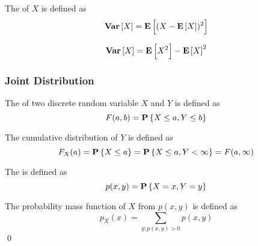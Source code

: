\begin{definition}[variance]
    The  of $X$ is defined as
    \begin{equation}
        \mathop{\bf Var\/}\left[ X \right] = \mathop{\bf E\/} \left[ (X - \mathop{\bf E\/} \left[ X \right])^2 \right]
    \end{equation}
\end{definition}


\begin{theorem}
    \begin{equation}
        \mathop{\bf Var\/}\left[ X \right] = \mathop{\bf E\/} \left[ X^2 \right] - \mathop{\bf E\/} \left[ X \right]^2
    \end{equation}
\end{theorem}



\subsubsection{Joint Distribution}

\begin{definition}
    The  of two discrete random variable $X$ and $Y$ is defined as
    \begin{equation}
        F(a,b) = \mathop{\bf P\/}\left\{ X \leq a, Y \leq b \right\}
    \end{equation}
    
    The cumulative distribution of $Y$ is defined as
    \begin{equation}
        F_X(a) = \mathop{\bf P\/}\left\{X \leq a \right\} =\mathop{\bf P\/}\left\{X \leq a, Y < \infty \right\} = F(a, \infty)
    \end{equation}
    
    The  is defined as 
    \begin{equation}
        p(x,y) =\mathop{\bf P\/}\left\{X = x, Y = y\right\}
    \end{equation}
    
    The probability mass function of $X$ from $p(x,y)$ is defined as
    \begin{equation}
        p_X(x) = \displaystyle \sum_{y: p(x,y) > 0} p(x,y)
    \end{equation}
    \qed
\end{definition}


